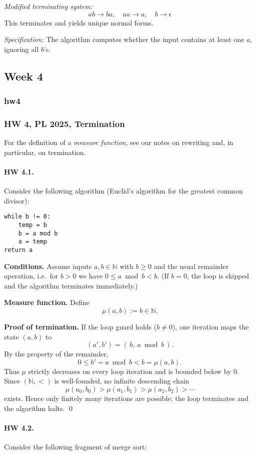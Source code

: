 \documentclass{article}
\theoremstyle{theorem}
\theoremstyle{definition}
\theoremstyle{remark}
\begin{document}
\textit{Modified terminating system:}
\[
ab \to ba, \quad aa \to a, \quad b \to \epsilon
\]
This terminates and yields unique normal forms.  

\textit{Specification:} The algorithm computes whether the input contains at least one $a$, ignoring all $b$’s.

\subsection{Week 4}
\subsubsection{hw4}
\subsubsection*{HW 4, PL 2025, Termination}
For the definition of a \emph{measure function}, see our notes on rewriting and, in particular, on termination.

\paragraph{HW 4.1.}
Consider the following algorithm (Euclid’s algorithm for the greatest common divisor):

\begin{verbatim}
while b != 0:
    temp = b
    b = a mod b
    a = temp
return a
\end{verbatim}

\textbf{Conditions.} Assume inputs $a,b \in \mathbb{N}$ with $b \geq 0$ and the usual remainder operation, i.e.\ for $b>0$ we have $0 \leq a \bmod b < b$. (If $b=0$, the loop is skipped and the algorithm terminates immediately.)

\textbf{Measure function.} Define
\[
\mu(a,b) := b \in \mathbb{N}.
\]

\textbf{Proof of termination.}  
If the loop guard holds ($b \neq 0$), one iteration maps the state $(a,b)$ to
\[
(a',b') = (\,b,\ a \bmod b\,).
\]
By the property of the remainder,
\[
0 \leq b' = a \bmod b < b = \mu(a,b).
\]
Thus $\mu$ strictly decreases on every loop iteration and is bounded below by $0$.  
Since $(\mathbb{N},<)$ is well-founded, no infinite descending chain
\[
\mu(a_0,b_0) > \mu(a_1,b_1) > \mu(a_2,b_2) > \cdots
\]
exists. Hence only finitely many iterations are possible; the loop terminates and the algorithm halts. \qed

\medskip

\paragraph{HW 4.2.}
Consider the following fragment of merge sort:
\end{document}
